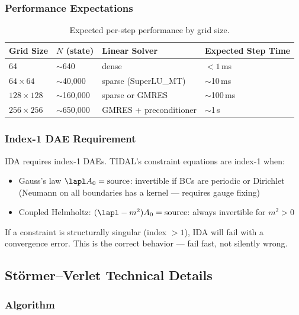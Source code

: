 \subsubsection{Performance Expectations}
\label{sec:performance-expectations}

\begin{table}[htbp]
\centering
\caption{Expected per-step performance by grid size.}
\label{tab:performance}
\begin{tabular}{@{}llll@{}}
\toprule
Grid Size & $N$ (state) & Linear Solver & Expected Step Time \\
\midrule
64 & $\sim$640 & dense & $< 1$\,ms \\
$64\times 64$ & $\sim$40{,}000 & sparse (SuperLU\_MT) & $\sim$10\,ms \\
$128\times 128$ & $\sim$160{,}000 & sparse or GMRES & $\sim$100\,ms \\
$256\times 256$ & $\sim$650{,}000 & GMRES + preconditioner & $\sim$1\,s \\
\bottomrule
\end{tabular}
\end{table}

\subsubsection{Index-1 DAE Requirement}
\label{sec:index1}

IDA requires index-1 DAEs. TIDAL's constraint equations are index-1 when:

\begin{itemize}
  \item Gauss's law $\lapl A_0 = \mathrm{source}$: invertible if BCs are periodic or Dirichlet
    (Neumann on all boundaries has a kernel --- requires gauge fixing)
  \item Coupled Helmholtz: $(\lapl - m^2)A_0 = \mathrm{source}$: always invertible for $m^2 > 0$
\end{itemize}

If a constraint is structurally singular (index $> 1$), IDA will fail with a
convergence error. This is the correct behavior --- fail fast, not silently wrong.

\subsection{St\"ormer--Verlet Technical Details}
\label{sec:verlet-details}

\subsubsection{Algorithm}
\label{sec:verlet-algorithm}

